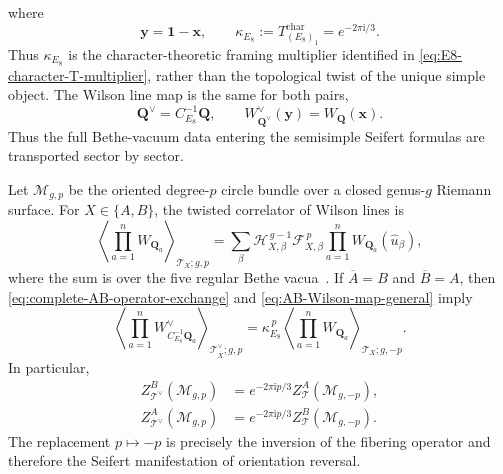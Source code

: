 \documentclass[11pt,a4paper]{article}
\numberwithin{equation}{section}
\begin{document}
where
\begin{equation}
  \boldsymbol y=\boldsymbol1-\boldsymbol x,
  \qquad
  \kappa_{E_8}
  :=T_{(E_8)_1}^{\mathrm{char}}
  =e^{-2\pi \mathrm{i}/3}.
  \label{eq:kappa-E8-definition}
\end{equation}
Thus $\kappa_{E_8}$ is the character-theoretic framing multiplier identified in \eqref{eq:E8-character-T-multiplier}, rather than the topological twist of the unique simple object.
The Wilson line map is the same for both pairs,
\begin{equation}
  \boldsymbol Q^\vee=C_{E_8}^{-1}\boldsymbol Q,
  \qquad
  W_{\boldsymbol Q^\vee}^\vee(\boldsymbol y)
  =W_{\boldsymbol Q}(\boldsymbol x).
  \label{eq:AB-Wilson-map-general}
\end{equation}
Thus the full Bethe-vacuum data entering the semisimple Seifert formulas are transported sector by sector.

Let $\mathcal M_{g,p}$ be the oriented degree-$p$ circle bundle over a closed genus-$g$ Riemann surface.  For $X\in\{A,B\}$, the twisted correlator of Wilson lines is
\begin{equation}
  \left\langle\prod_{a=1}^{n}W_{\boldsymbol Q_a}\right\rangle_{\mathcal T_X;g,p}
  =
  \sum_{\beta}
  \mathcal H_{X,\beta}^{\,g-1}
  \mathcal F_{X,\beta}^{\,p}
  \prod_{a=1}^{n}W_{\boldsymbol Q_a}(\widehat u_\beta),
  \label{eq:Seifert-Wilson-correlator}
\end{equation}
where the sum is over the five regular Bethe vacua~\cite{Closset:2017zgf,ClossetKimWillett:2018Seifert,Gaiotto:2024ioj}.  If $\overline A=B$ and $\overline B=A$, then \eqref{eq:complete-AB-operator-exchange} and \eqref{eq:AB-Wilson-map-general} imply
\begin{equation}
  \left\langle
  \prod_{a=1}^{n}W_{C_{E_8}^{-1}\boldsymbol Q_a}^\vee
  \right\rangle_{\mathcal T_{\overline X}^\vee;g,p}
  =
  \kappa_{E_8}^{\,p}
  \left\langle
  \prod_{a=1}^{n}W_{\boldsymbol Q_a}
  \right\rangle_{\mathcal T_X;g,-p}.
  \label{eq:AB-Seifert-Wilson-exchange}
\end{equation}
In particular,
\begin{align}
  Z_{\mathcal T^\vee}^{B}(\mathcal M_{g,p})
  &=e^{-2\pi \mathrm{i} p/3}
    Z_{\mathcal T}^{A}(\mathcal M_{g,-p}),
  \nonumber\\
  Z_{\mathcal T^\vee}^{A}(\mathcal M_{g,p})
  &=e^{-2\pi \mathrm{i} p/3}
    Z_{\mathcal T}^{B}(\mathcal M_{g,-p}).
  \label{eq:AB-Seifert-partition-exchange}
\end{align}
The replacement $p\mapsto-p$ is precisely the inversion of the fibering operator and therefore the Seifert manifestation of orientation reversal.
\end{document}
